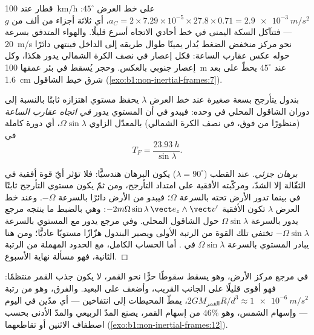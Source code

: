 \begin{example}\label{ex:b1:non-inertial-frames:coriolisnum}
قطار عند \qty{100}{km/h} على خط العرض $45^\circ$: $a_C = 2 \times 7.29\times
10^{-5} \times 27.8 \times 0.71 = \qty{2.9e-3}{m/s^2}$، أي ثلاثة أجزاء من ألف من
$g$ --- فتتآكل السكة اليمنى في خط أحادي الاتجاه أسرع قليلًا. والهواء
المتدفق بسرعة \qty{20}{m/s} نحو مركز منخفض الضغط يُدار يمينًا طوال
طريقه إلى الداخل فينتهي دائرًا حوله عكس عقارب الساعة: فكل إعصار في
نصف الكرة الشمالي يدور هكذا، وكل إعصار جنوبي بالعكس. وحجر
يُسقط في بئر عمقها \qty{100}{m} عند $45^\circ$ يحطّ على بعد \qty{1.6}{cm} شرق
خيط الشاقول (\cref{exo:b1:non-inertial-frames:7}).
\end{example}

\begin{proposition}\label{prop:b1:non-inertial-frames:foucault}
بندول يتأرجح بسعة صغيرة عند خط العرض $\lambda$ يحفظ
مستوي اهتزازه ثابتًا بالنسبة إلى دوران الشاقول المحلي في  وحده: فيبدو في  أن المستوي يدور
\emph{في اتجاه عقارب الساعة} (منظورًا من فوق، في نصف الكرة الشمالي) بالمعدّل الزاوي
$\Omega\sin\lambda$، أي دورة كاملة في
\[
T_F = \frac{\qty{23.93}{h}}{\sin\lambda} .
\]
\end{proposition}

\begin{proof}[برهان جزئي]
عند القطب ($\lambda = 90^\circ$) يكون البرهان هندسيًّا: فلا تؤثر أيّ قوة
أفقية في الثقّالة إلا الشدّ، ومركّبته الأفقية
على امتداد التأرجح، ومن ثمّ يكون مستوي التأرجح ثابتًا في 
بينما تدور الأرض تحته بالسرعة $\Omega$؛ فيبدو من الأرض دائرًا
بالسرعة $-\Omega$. وعند خط العرض $\lambda$ تكون  الأفقية
$-2m\Omega\sin\lambda\,\vect e_z\wedge\vect v'$: وهي بالضبط ما ينتجه مرجع يدور بالسرعة
$\Omega\sin\lambda$ حول الشاقول المحلي. وفي مرجع يدور
مع المستوي بالسرعة $-\Omega\sin\lambda$ تختفي تلك القوة من الرتبة الأولى
ويصير البندول هزّازًا مستويًا عاديًّا؛ ومن هنا يبادر المستوي
بالسرعة $\Omega\sin\lambda$ في . أما الحساب
الكامل، مع الحدود المهملة من الرتبة الثانية، فهو مسألة نهاية
الأسبوع.
\end{proof}

\begin{remark}\label{rem:b1:non-inertial-frames:tides}
في مرجع مركز الأرض، وهو يسقط سقوطًا حرًّا نحو القمر،
لا يكون جذب القمر منتظمًا: فهو أقوى قليلًا على الجانب القريب،
وأضعف على البعيد. والفرق، وهو من رتبة $2GM_{\text{القمر}}R/d^3
\approx \qty{1e-6}{m/s^2}$، يمطّ المحيطات إلى انتفاخين --- أي مدّين
في اليوم --- وإسهام الشمس، وهو $46\%$ من إسهام القمر، يصنع
المدّ الربيعي والمدّ الأدنى بحسب اصطفاف الاثنين أو تقاطعهما
(\cref{exo:b1:non-inertial-frames:12}).
\end{remark}

